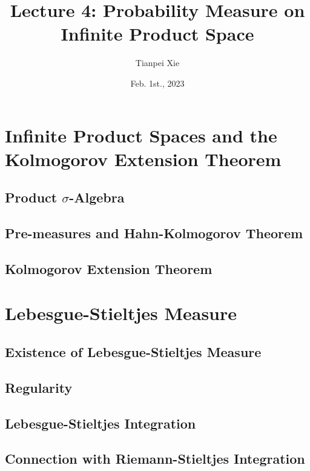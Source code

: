 \documentclass[11pt]{article}
\begin{document}
\title{Lecture 4: Probability Measure on Infinite Product Space}
\author{ Tianpei Xie}
\date{Feb. 1st., 2023}
\maketitle
\tableofcontents
\newpage
\section{Infinite Product Spaces and the Kolmogorov Extension Theorem}
\subsection{Product $\sigma$-Algebra}
\subsection{Pre-measures and Hahn-Kolmogorov Theorem}
\subsection{Kolmogorov Extension Theorem}


\section{Lebesgue-Stieltjes Measure}
\subsection{Existence of Lebesgue-Stieltjes Measure}
\subsection{Regularity}
\subsection{Lebesgue-Stieltjes Integration}
\subsection{Connection with Riemann-Stieltjes Integration}


\newpage


\end{document}
